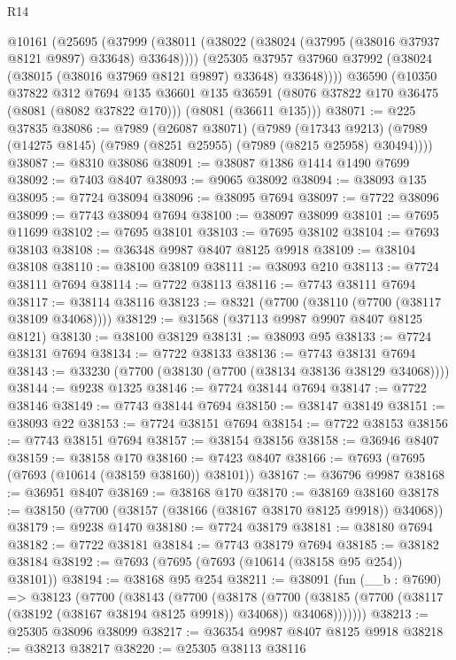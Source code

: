 \begin{lexlean}{R14}
\begin{coremodule}
    @10161
      (@25695
        (@37999 (@38011 (@38022 (@38024 (@37995 (@38016 @37937 @8121 @9897) @33648) @33648))))
        (@25305 @37957 @37960 @37992 (@38024 (@38015 (@38016 @37969 @8121 @9897) @33648) @33648))))
    @36590
    (@10350
      @37822
      @312
      @7694
      @135
      @36601
      @135
      @36591
      (@8076 @37822 @170 @36475 (@8081 (@8082 @37822 @170)))
      (@8081 (@36611 @135)))
@38071 := @225 @37835
@38086 := @7989
    (@26087 @38071)
    (@7989
      (@17343 @9213)
      (@7989 (@14275 @8145) (@7989 (@8251 @25955) (@7989 (@8215 @25958) @30494))))
@38087 := @8310 @38086
@38091 := @38087 @1386 @1414 @1490 @7699
@38092 := @7403 @8407
@38093 := @9065 @38092
@38094 := @38093 @135
@38095 := @7724 @38094
@38096 := @38095 @7694
@38097 := @7722 @38096
@38099 := @7743 @38094 @7694
@38100 := @38097 @38099
@38101 := @7695 @11699
@38102 := @7695 @38101
@38103 := @7695 @38102
@38104 := @7693 @38103
@38108 := @36348 @9987 @8407 @8125 @9918
@38109 := @38104 @38108
@38110 := @38100 @38109
@38111 := @38093 @210
@38113 := @7724 @38111 @7694
@38114 := @7722 @38113
@38116 := @7743 @38111 @7694
@38117 := @38114 @38116
@38123 := @8321 (@7700 (@38110 (@7700 (@38117 @38109 @34068))))
@38129 := @31568 (@37113 @9987 @9907 @8407 @8125 @8121)
@38130 := @38100 @38129
@38131 := @38093 @95
@38133 := @7724 @38131 @7694
@38134 := @7722 @38133
@38136 := @7743 @38131 @7694
@38143 := @33230 (@7700 (@38130 (@7700 (@38134 @38136 @38129 @34068))))
@38144 := @9238 @1325
@38146 := @7724 @38144 @7694
@38147 := @7722 @38146
@38149 := @7743 @38144 @7694
@38150 := @38147 @38149
@38151 := @38093 @22
@38153 := @7724 @38151 @7694
@38154 := @7722 @38153
@38156 := @7743 @38151 @7694
@38157 := @38154 @38156
@38158 := @36946 @8407
@38159 := @38158 @170
@38160 := @7423 @8407
@38166 := @7693 (@7695 (@7693 (@10614 (@38159 @38160)) @38101))
@38167 := @36796 @9987
@38168 := @36951 @8407
@38169 := @38168 @170
@38170 := @38169 @38160
@38178 := @38150 (@7700 (@38157 (@38166 (@38167 @38170 @8125 @9918)) @34068))
@38179 := @9238 @1470
@38180 := @7724 @38179
@38181 := @38180 @7694
@38182 := @7722 @38181
@38184 := @7743 @38179 @7694
@38185 := @38182 @38184
@38192 := @7693 (@7695 (@7693 (@10614 (@38158 @95 @254)) @38101))
@38194 := @38168 @95 @254
@38211 := @38091
    (fun (__b : @7690) =>
    @38123
      (@7700
        (@38143
          (@7700
            (@38178
              (@7700
                (@38185 (@7700 (@38117 (@38192 (@38167 @38194 @8125 @9918)) @34068)) @34068)))))))
@38213 := @25305 @38096 @38099
@38217 := @36354 @9987 @8407 @8125 @9918
@38218 := @38213 @38217
@38220 := @25305 @38113 @38116

\end{coremodule}
\end{lexlean}

